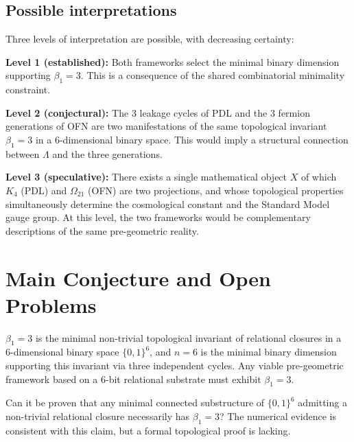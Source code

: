 \documentclass[11pt,a4paper]{article}
\begin{document}
\subsection{Possible interpretations}

Three levels of interpretation are possible, with decreasing certainty:

\textbf{Level 1 (established):} Both frameworks select the minimal binary dimension supporting $\beta_1 = 3$. This is a consequence of the shared combinatorial minimality constraint.

\textbf{Level 2 (conjectural):} The 3 leakage cycles of PDL and the 3 fermion generations of OFN are two manifestations of the same topological invariant $\beta_1 = 3$ in a 6-dimensional binary space. This would imply a structural connection between $\Lambda$ and the three generations.

\textbf{Level 3 (speculative):} There exists a single mathematical object $X$ of which $K_4$ (PDL) and $\Omega_{21}$ (OFN) are two projections, and whose topological properties simultaneously determine the cosmological constant and the Standard Model gauge group. At this level, the two frameworks would be complementary descriptions of the same pre-geometric reality.

\section{Main Conjecture and Open Problems}
\label{sec:conjecture}

\begin{conjecture_box}[label={conj:main}]
$\beta_1 = 3$ is the minimal non-trivial topological invariant of relational closures in a 6-dimensional binary space $\{0,1\}^6$, and $n = 6$ is the minimal binary dimension supporting this invariant via three independent cycles. Any viable pre-geometric framework based on a 6-bit relational substrate must exhibit $\beta_1 = 3$.
\end{conjecture_box}

\begin{open_box}[title={OP-1: Formal proof of Conjecture~\ref{conj:main}}]
Can it be proven that any minimal connected substructure of $\{0,1\}^6$ admitting a non-trivial relational closure necessarily has $\beta_1 = 3$? The numerical evidence is consistent with this claim, but a formal topological proof is lacking.
\end{open_box}
\end{document}
